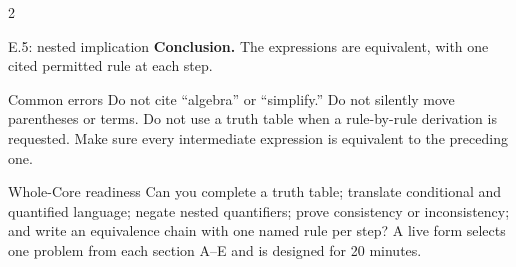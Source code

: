 \documentclass[10pt]{article}
\begin{document}
\begin{multicols}{2}
\begin{workedbox}{E.5: nested implication}
\textbf{Conclusion.} The expressions are equivalent, with one cited permitted rule at each step.
\end{workedbox}

\begin{warningbox}{Common errors}
Do not cite ``algebra'' or ``simplify.'' Do not silently move parentheses or
terms. Do not use a truth table when a rule-by-rule derivation is requested.
Make sure every intermediate expression is equivalent to the preceding one.
\end{warningbox}

\begin{checklistbox}{Whole-Core readiness}
Can you complete a truth table; translate conditional and quantified language;
negate nested quantifiers; prove consistency or inconsistency; and write an
equivalence chain with one named rule per step? A live form selects one problem
from each section A--E and is designed for 20 minutes.
\end{checklistbox}
\end{multicols}
\end{document}
